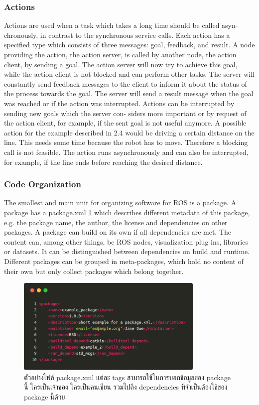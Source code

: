 \subsubsection*{Actions}
Actions  are  used  when  a  task  which  takes  a  long  time  should  be  called  asyn-
chronously, in contrast to the synchronous service calls.  Each action has a specified
type which consists of three messages:  goal, feedback, and result.  A node providing
the action, the action server, is called by another node, the action client, by sending
a goal.  The action server will now try to achieve this goal, while the action client is
not blocked and can perform other tasks.  The server will constantly send feedback
messages to the client to inform it about the status of the process towards the goal.
The server will send a result message when the goal was reached or if the action was
interrupted.  Actions can be interrupted by sending new goals which the server con-
siders more important or by request of the action client, for example, if the sent goal
is not useful anymore.  A possible action for the example described in 2.4 would be
driving a certain distance on the line.  This needs some time because the robot has
to move.  Therefore a blocking call is not feasible.  The action runs asynchronously
and can also be interrupted, for example, if the line ends before reaching the desired
distance.

\subsubsection*{Code Organization}
The smallest and main unit for organizing software for ROS is a package.  A package
has a
package.xml
\ref{fig:example_packagexml} which describes different metadata of this package,
e.g.  the package name, the author, the license and dependencies on other packages.
A package can build on its own if all dependencies are met.  The content can, among
other things, be ROS nodes, visualization plug ins, libraries or datasets.  It can be
distinguished between dependencies on build and runtime.  Different packages can
be grouped in meta-packages, which hold no content of their own but only collect
packages which belong together.

\begin{figure}[htbp]
    \centering
    \includegraphics[width=0.8\textwidth]{chapter2/images/example_packagexml.png}
	\caption{ตัวอย่างไฟล์ package.xml แต่ละ tags สามารถใช้ในการบอกข้อมูลของ package นี้
	ใครเป็นเจ้าของ ใครเป็นคนเขียน รวมไปถึง dependencies ที่จำเป็นต้องใช้ของ package นี้ด้วย}
    \label{fig:example_packagexml}
\end{figure}

